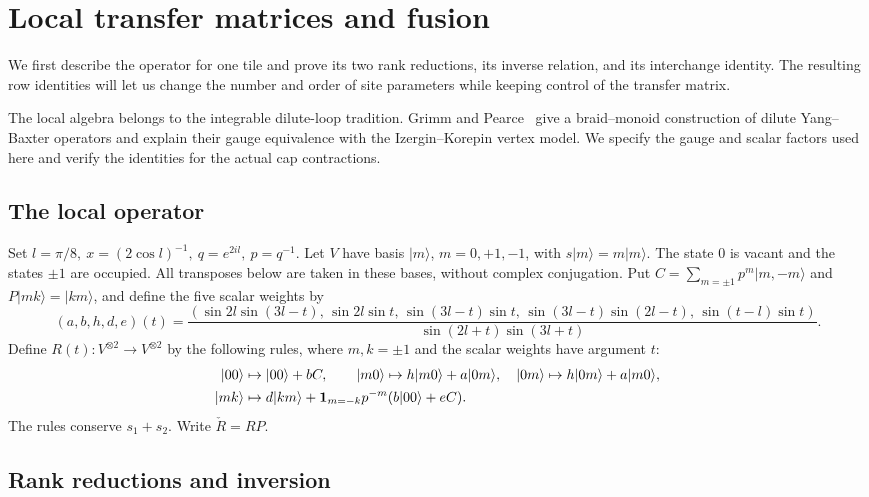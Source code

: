 \section{Local transfer matrices and fusion}\label{sec:local}

We first describe the operator for one tile and prove its two rank reductions, its inverse relation, and its interchange identity. The resulting row identities will let us change the number and order of site parameters while keeping control of the transfer matrix.

The local algebra belongs to the integrable dilute-loop tradition. Grimm and Pearce~\cite{GrimmPearce1993} give a braid--monoid construction of dilute Yang--Baxter operators and explain their gauge equivalence with the Izergin--Korepin vertex model. We specify the gauge and scalar factors used here and verify the identities for the actual cap contractions.

\subsection{The local operator}

Set \(l=\pi/8,\ x=(2\cos l)^{-1},\ q=e^{2il},\ p=q^{-1}\). Let \(V\) have basis \(|m\rangle\), \(m=0,+1,-1\), with \(s|m\rangle=m|m\rangle\). The state \(0\) is vacant and the states \(\pm1\) are occupied. All transposes below are taken in these bases, without complex conjugation. Put \(C=\sum_{m=\pm1}p^m|m,-m\rangle\) and \(P|mk\rangle=|km\rangle\), and define the five scalar weights by
{\small
\[
 (a,b,h,d,e)(t)=
 \frac{(\sin2l\sin(3l-t),\,\sin2l\sin t,\,\sin(3l-t)\sin t,\,
 \sin(3l-t)\sin(2l-t),\,\sin(t-l)\sin t)}{\sin(2l+t)\sin(3l+t)} .
\]
}
Define \(R(t):V^{\otimes2}\to V^{\otimes2}\) by the following rules, where \(m,k=\pm1\) and the scalar weights have argument \(t\):
\[
 \begin{split}
 |00\rangle&\mapsto |00\rangle+b C,\qquad
 |m0\rangle\mapsto h|m0\rangle+a|0m\rangle,\quad |0m\rangle\mapsto h|0m\rangle+a|m0\rangle,\\
 |mk\rangle&\mapsto d|km\rangle+{\bf1}_{m=-k}p^{-m}(b|00\rangle+eC).
 \end{split}
\]
The rules conserve \(s_1+s_2\). Write \(\check R=R P\).

\subsection{Rank reductions and inversion}

